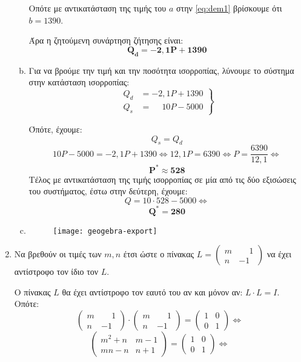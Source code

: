 \begin{enumerate}
\begin{enumerate}[a)]
Οπότε με αντικατάσταση της τιμής του $a$ στην \eqref{eq:dem1} βρίσκουμε ότι $b=1390$.

Άρα η ζητούμενη συνάρτηση ζήτησης είναι:
\[
\boldsymbol{Q_d=-2,1P+1390}
\]

\item Για να βρούμε την τιμή και την ποσότητα ισορροπίας, λύνουμε το σύστημα στην κατάσταση ισορροπίας:
\[
\left.
\begin{align*}
Q_d&=-2,1P+1390 \\
Q_s&=\phantom{-}10P-5000
\end{align*}
\right\}
\]

Όπότε, έχουμε:
\[
Q_s=Q_d
\]
\[
10P-5000=-2,1P+1390\Leftrightarrow 12,1P=6390\Leftrightarrow P=\frac{6390}{12,1} \Leftrightarrow
\]
\[
 \boldsymbol{P^*\approx 528}
\]
Τέλος με αντικατάσταση της τιμής ισορροπίας σε μία από τις δύο εξισώσεις του συστήματος, έστω στην δεύτερη, έχουμε:
\[
Q=10\cdot 528-5000\Leftrightarrow 
\]
\[
\boldsymbol{Q^*=280}
\]

\item 

\begin{figure}[h]
\begin{center}
\texttt{[image: geogebra-export]}
\end{center}
\end{figure}

\end{enumerate}


\item Να βρεθούν οι τιμές των $m, n$ έτσι ώστε ο πίνακας 
\(
L=\begin{pmatrix}
m & \phantom{-}1 \\
n & -1
\end{pmatrix}
\)
να έχει αντίστροφο τον ίδιο τον $L$.

Ο πίνακας $L$ θα έχει αντίστροφο τον εαυτό του αν και μόνον αν: $L\cdot L=I$. Οπότε:
\[
\begin{pmatrix}
m & \phantom{-}1\\
n & -1
\end{pmatrix}\cdot 
\begin{pmatrix}
m & \phantom{-}1 \\
n & -1
\end{pmatrix}=
\begin{pmatrix}
1 & 0 \\
0 & 1
\end{pmatrix}\Leftrightarrow
\]
\[
\begin{pmatrix}
m^2+n & m-1 \\
mn-n & n+1
\end{pmatrix}=
\begin{pmatrix}
1 & 0 \\
0 & 1
\end{pmatrix}\Leftrightarrow
\]


\end{enumerate}
